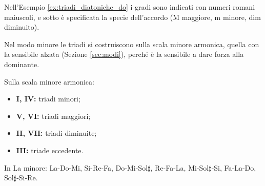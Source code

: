 \begin{esempio}
	\label{ex:triadi_diatoniche_do}
\end{esempio}

Nell'Esempio \ref{ex:triadi_diatoniche_do} i gradi sono indicati con numeri romani maiuscoli, e sotto è specificata la specie dell'accordo (M maggiore, m minore, dim diminuito).

Nel modo minore le triadi si costruiscono sulla scala minore armonica, quella con la sensibile alzata (Sezione \ref{sec:modi}), perché è la sensibile a dare forza alla dominante.

\begin{definizione}
	\label{def:triadi_diatoniche_minore}
	Sulla scala minore armonica:
	\begin{itemize}
		\item \textbf{I, IV:} triadi minori;
		\item \textbf{V, VI:} triadi maggiori;
		\item \textbf{II, VII:} triadi diminuite;
		\item \textbf{III:} triade eccedente.
	\end{itemize}
	In La minore: La-Do-Mi, Si-Re-Fa, Do-Mi-Sol$\sharp$, Re-Fa-La, Mi-Sol$\sharp$-Si, Fa-La-Do, Sol$\sharp$-Si-Re.
\end{definizione}
